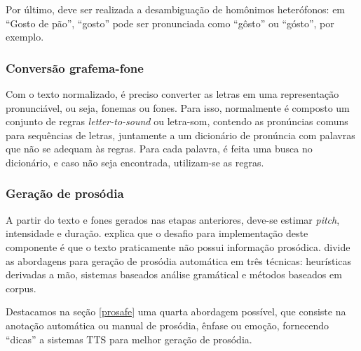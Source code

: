 Por último, deve ser realizada a desambiguação de homônimos heterófonos: em
``Gosto de pão'', ``gosto'' pode ser pronunciada como ``gôsto'' ou ``gósto'',
por exemplo.

\subsubsection{Conversão grafema-fone}
Com o texto normalizado, é preciso converter as letras em uma representação
pronunciável, ou seja, fonemas ou fones. Para isso, normalmente é composto um
conjunto de regras \emph{letter-to-sound} ou letra-som, contendo as pronúncias
comuns para sequências de letras, juntamente a um dicionário de pronúncia com
palavras que não se adequam às regras. Para cada palavra, é feita uma busca no
dicionário, e caso não seja encontrada, utilizam-se as regras.



\subsubsection{Geração de prosódia}
\label{gerpros}
A partir do texto e fones gerados nas etapas anteriores, deve-se estimar
\emph{pitch}, intensidade e duração.  explica que o
desafio para implementação deste componente é que o texto praticamente não
possui informação prosódica.  divide as abordagens para
geração de prosódia automática em três técnicas: heurísticas derivadas a mão,
sistemas baseados análise gramátical e métodos baseados em corpus.

Destacamos na seção \ref{prosafe} uma quarta abordagem possível, que consiste na
anotação automática ou manual de prosódia, ênfase ou emoção, fornecendo
``dicas'' a sistemas TTS para melhor geração de prosódia.

